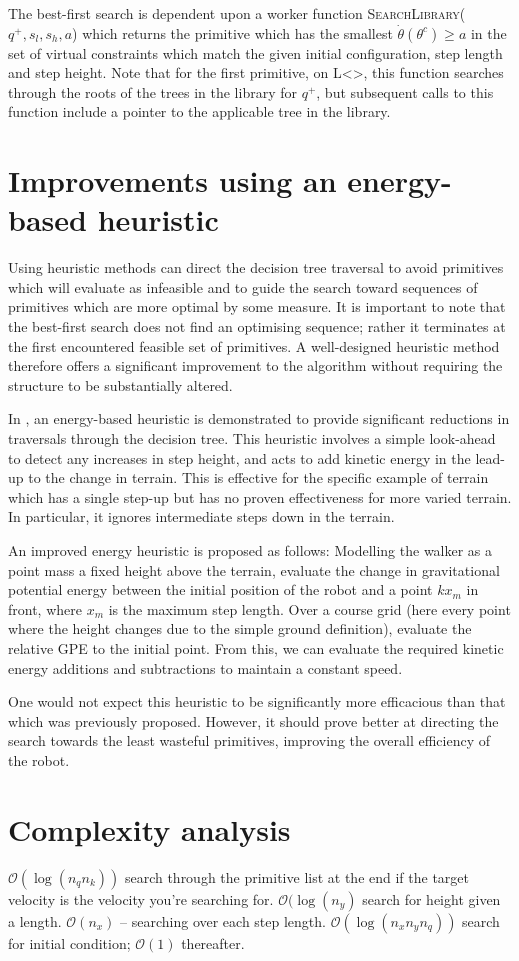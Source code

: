 The best-first search is dependent upon a worker function \textsc{SearchLibrary}($q^+,s_l,s_h,a$) which returns the primitive which has the smallest $\dot{\theta}(\theta^c) \geq a$ in the set of virtual constraints which match the given initial configuration, step length and step height. Note that for the first primitive, on {\color{blue} L<>}, this function searches through the roots of the trees in the library for $q^+$, but subsequent calls to this function include a pointer to the applicable tree in the library.

\section[Energy-based heuristic]{Improvements using an energy-based heuristic}
Using heuristic methods can direct the decision tree traversal to avoid primitives which will evaluate as infeasible and to guide the search toward sequences of primitives which are more optimal by some measure. It is important to note that the best-first search does not find an optimising sequence; rather it terminates at the first encountered feasible set of primitives. A well-designed heuristic method therefore offers a significant improvement to the algorithm without requiring the structure to be substantially altered.

In \cite{manchester13planning}, an energy-based heuristic is demonstrated to provide significant reductions in traversals through the decision tree. This heuristic involves a simple look-ahead to detect any increases in step height, and acts to add kinetic energy in the lead-up to the change in terrain. This is effective for the specific example of terrain which has a single step-up but has no proven effectiveness for more varied terrain. In particular, it ignores intermediate steps down in the terrain.

{\color{blue}An improved energy heuristic is proposed as follows: Modelling the walker as a point mass a fixed height above the terrain, evaluate the change in gravitational potential energy between the initial position of the robot and a point $kx_m$ in front, where $x_m$ is the maximum step length. Over a course grid (here every point where the height changes due to the simple ground definition), evaluate the relative GPE to the initial point. From this, we can evaluate the required kinetic energy additions and subtractions to maintain a constant speed.
	
One would not expect this heuristic to be significantly more efficacious than that which was previously proposed. However, it should prove better at directing the search towards the least wasteful primitives, improving the overall efficiency of the robot.}

\section{Complexity analysis}
$\mathcal{O}(\log(n_qn_k))$ search through the primitive list at the end if the target velocity is the velocity you're searching for. $\mathcal{O}(\log(n_y)$ search for height given a length. $\mathcal{O}(n_x)$ -- searching over each step length. $\mathcal{O}(\log(n_xn_yn_q))$ search for initial condition; $\mathcal{O}(1)$ thereafter.